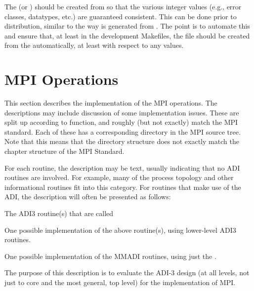 \documentclass{article}
\begin{document}
The  (or ) should be created from
 so that the various integer values (e.g., error classes,
datatypes, etc.) are guaranteed consistent.  This can be done prior to
distribution, similar to the way  is generated from
.  The point is to automate this and ensure that,
at least in the development Makefiles, the  file
should be created from the  automatically, at least with
respect to any values. 

\section{MPI Operations}
\label{sec:mpi-operations}
This section describes the implementation of the MPI operations.  The
descriptions may include discussion of some implementation issues.
These are split up according to function, and roughly (but not
exactly) match the MPI standard.  Each of these has a corresponding
directory in the MPI source tree.  Note that this means that the
directory structure does not exactly match the chapter structure of
the MPI Standard.

For each routine, the description may be text, usually indicating that no ADI
routines are involved.  For example, many of the process topology and other
informational routines fit into this category.
For routines that make use of the ADI, the description will often be presented
as follows:
\begin{adi3}The ADI3 routine(s) that are called
\begin{mmadi}One possible implementation of the above routine(s), using
  lower-level ADI3 routines.
\begin{core}One possible implementation of the MMADI routines, using just the
  . 
\end{core}
\end{mmadi}
\end{adi3}
The purpose of this description is to evaluate the ADI-3 design (at all
levels, not just to core and the most general, top level) for the
implementation of MPI.  
\end{document}
